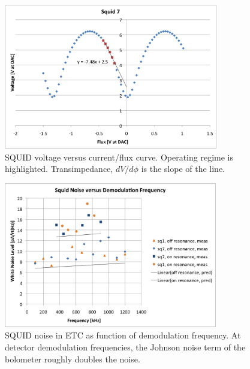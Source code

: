 \begin{figure}[ht!]
\begin{center}
\includegraphics[height=2.5in]{figures/squid7_transimp}
\caption{\ac{SQUID} voltage versus current/flux curve. Operating regime is highlighted. Transimpedance, $dV/d\phi$ is the slope of the line.
\label{fig:squid_transimpedance} }
\end{center}
\end{figure}

\begin{figure}[ht!]
\begin{center}
\includegraphics[height=2.5in]{figures/squidnoise_temp}
\caption{\ac{SQUID} noise in \ac{ETC} as function of demodulation frequency. At detector demodulation frequencies, the Johnson noise term of the bolometer roughly doubles the noise.
\label{fig:dark_squid_noise} }
\end{center}
\end{figure}



